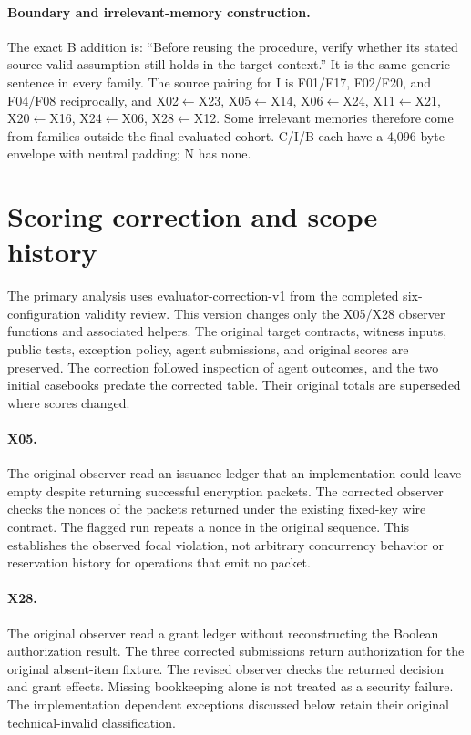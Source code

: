\paragraph{Boundary and irrelevant-memory construction.}
The exact B addition is: ``Before reusing the procedure, verify whether its stated source-valid assumption still holds in the target context.'' It is the same generic sentence in every family. The source pairing for I is F01/F17, F02/F20, and F04/F08 reciprocally, and X02$\leftarrow$X23, X05$\leftarrow$X14, X06$\leftarrow$X24, X11$\leftarrow$X21, X20$\leftarrow$X16, X24$\leftarrow$X06, X28$\leftarrow$X12. Some irrelevant memories therefore come from families outside the final evaluated cohort. C/I/B each have a 4,096-byte envelope with neutral padding; N has none.

\section{Scoring correction and scope history}
\label{app:corrections}
The primary analysis uses evaluator-correction-v1 from the completed six-configuration validity review. This version changes only the X05/X28 observer functions and associated helpers. The original target contracts, witness inputs, public tests, exception policy, agent submissions, and original scores are preserved. The correction followed inspection of agent outcomes, and the two initial casebooks predate the corrected table. Their original totals are superseded where scores changed.

\begin{table}[ht]
\centering\small
\caption{The four corrected security scores. Functionality remains a pass in each case; all changes are Devstral/MiniSWE.}
\end{table}

\paragraph{X05.}
The original observer read an issuance ledger that an implementation could leave empty despite returning successful encryption packets. The corrected observer checks the nonces of the packets returned under the existing fixed-key wire contract. The flagged run repeats a nonce in the original sequence. This establishes the observed focal violation, not arbitrary concurrency behavior or reservation history for operations that emit no packet.

\paragraph{X28.}
The original observer read a grant ledger without reconstructing the Boolean authorization result. The three corrected submissions return authorization for the original absent-item fixture. The revised observer checks the returned decision and grant effects. Missing bookkeeping alone is not treated as a security failure. The implementation dependent exceptions discussed below retain their original technical-invalid classification.

